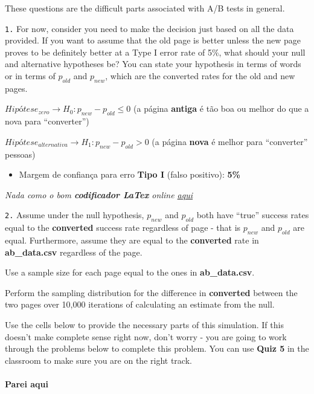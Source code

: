 \documentclass[11pt]{article}
\providecommand{\tightlist}{%
      \setlength{\itemsep}{0pt}\setlength{\parskip}{0pt}}
\begin{document}
These questions are the difficult parts associated with A/B tests in
general.

\texttt{1.} For now, consider you need to make the decision just based
on all the data provided. If you want to assume that the old page is
better unless the new page proves to be definitely better at a Type I
error rate of 5\%, what should your null and alternative hypotheses be?
You can state your hypothesis in terms of words or in terms of
\textbf{\(p_{old}\)} and \textbf{\(p_{new}\)}, which are the converted
rates for the old and new pages.

    \(Hipótese_{zero} \rightarrow H_0: p_{new} - p_{old} \leq 0\) (a página
\textbf{antiga} é tão boa ou melhor do que a nova para ``converter'')

\(Hipótese_{alternativa} \rightarrow H_1: p_{new} - p_{old} > 0\) (a
página \textbf{nova} é melhor para ``converter'' pessoas)

\begin{itemize}
\tightlist
\item
  Margem de confiança para erro \textbf{Tipo I} (falso positivo):
  \textbf{5\%}
\end{itemize}

\emph{Nada como o bom \textbf{codificador LaTex} online
\href{https://latex.codecogs.com/eqneditor/editor.php}{aqui}}

    \texttt{2.} Assume under the null hypothesis, \(p_{new}\) and
\(p_{old}\) both have ``true'' success rates equal to the
\textbf{converted} success rate regardless of page - that is \(p_{new}\)
and \(p_{old}\) are equal. Furthermore, assume they are equal to the
\textbf{converted} rate in \textbf{ab\_data.csv} regardless of the page.

Use a sample size for each page equal to the ones in
\textbf{ab\_data.csv}.

Perform the sampling distribution for the difference in
\textbf{converted} between the two pages over 10,000 iterations of
calculating an estimate from the null.

Use the cells below to provide the necessary parts of this simulation.
If this doesn't make complete sense right now, don't worry - you are
going to work through the problems below to complete this problem. You
can use \textbf{Quiz 5} in the classroom to make sure you are on the
right track.

    \hypertarget{parei-aqui}{%
\paragraph{Parei aqui}\label{parei-aqui}}
\end{document}
